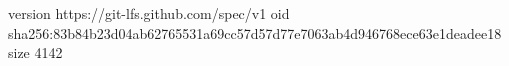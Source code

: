 version https://git-lfs.github.com/spec/v1
oid sha256:83b84b23d04ab62765531a69cc57d57d77e7063ab4d946768ece63e1deadee18
size 4142
